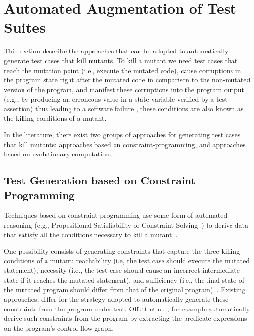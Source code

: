 
\section{Automated Augmentation of Test Suites}
\label{sec:testGeneration}

This section describe the approaches that can be adopted to automatically generate test cases that kill mutants.
To kill a mutant we need test cases that reach the mutation point (i.e., execute the mutated code), cause 
corruptions
in the program state right after the mutated code in comparison to the non-mutated version of the program, 
and manifest these corruptions into the program output 
(e.g., by producing an erroneous value in a state variable verified by a test assertion) 
thus leading to a software failure \cite{papadakis2019mutation}, these conditions are also known as the killing conditions of a mutant.

In the literature, there exist two groups of approaches for 
generating test cases that kill mutants:
approaches based on constraint-programming, and approaches based on evolutionary computation.

\subsection{Test Generation based on Constraint Programming}

Techniques based on constraint programming use some form of automated reasoning (e.g., Propositional Satisfiability or Constraint Solving~\cite{SATandCPsurvey:2006}) to derive data that satisfy all the conditions necessary to kill a mutant~\cite{offutt1997automatically}.

One possibility consists of generating constraints that capture the three killing conditions of a mutant: reachability (i.e, the test case should execute the mutated statement), necessity (i.e., the test case should cause an incorrect intermediate state if it reaches the mutated statement), and sufficiency (i.e., the final state of the mutated program should differ from that of the original program)~\cite{offutt1997automatically}. Existing approaches, differ for the strategy adopted to automatically generate these constraints from the program under test.
Offutt et al. \cite{offutt1997automatically}, for example automatically derive such constraints from the program by extracting the predicate expressions on the program's control flow graph.

